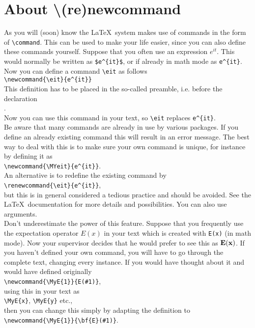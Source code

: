 \section{About {\textbackslash}(re)newcommand}
As you will (soon) know the \LaTeX\ system makes use of commands in
the form of \verb"\command". This can be used to make your life
easier, since you can also define these commands yourself. Suppose
that you often use an expression $e^{it}$. This would
normally be written as \verb"$e^{it}$", or if already in math mode
as \verb"e^{it}". Now you can define a command
\verb"\eit" as follows\\
\verb"\newcommand{\eit}{e^{it}}"\\
This definition has to be placed in the so-called preamble, i.e.
before the declaration\\ \verb"".\\ Now you can use
this
command in your text, so \verb"\eit" replaces \verb"e^{it}".\\
Be aware that many commands are already in use by various packages.
If you define an already existing command this will result in an
error message. The best way to deal with this is to make sure your
own command is unique, for instance by defining it as\\
\verb"\newcommand{\MYeit}{e^{it}}".\\
An alternative is to redefine the existing command by\\
\verb"\renewcommand{\eit}{e^{it}}",\\
but this is in general considered a tedious practice and should be
avoided.
See the \LaTeX\ documentation for more details and possibilities. You can also use arguments.\\
%
Don't underestimate the power of this feature. Suppose that you
frequently use the expectation operator $E(x)$ in your text which is
created with \verb"E(x)" (in math mode). Now your supervisor decides
that he would prefer to see this as $\bf{E}(x)$. If you haven't
defined your own command, you will have to go through the complete
text, changing every instance. If you would have thought about it
and
would have defined originally\\
\verb"\newcommand{\MyE{1}}{E(#1)}",\\
using this in your text as \\
\verb"\MyE{x}", \verb"\MyE{y}" etc.,\\
then you can change this simply by adapting the definition to\\
\verb"\newcommand{\MyE{1}}{\bf{E}(#1)}".
